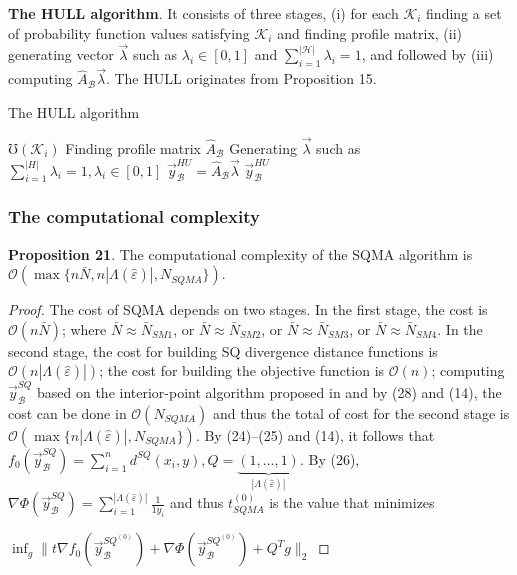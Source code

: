 \documentclass[]{iosart2c}
\begin{document}
  \textbf{The HULL algorithm}. It consists of three stages, (i) for each $\mathcal{K}_i$ finding a set of probability function
  values satisfying $\mathcal{K}_i$ and finding profile matrix, (ii)
  generating vector $\vec{\lambda}$ such as $\lambda_i \in [0, 1]$ and
  $\sum^{|\mathcal{H}|}_{i=1} \lambda_i = 1$, and followed by (iii) computing $\hat{A}_\mathcal{B}\vec{\lambda}$. The HULL originates from Proposition 15.

  \begin{algorithm}
    \caption{The HULL algorithm}
    \begin{algorithmic}[1]
        \State $\mho(\mathcal{K}_i)$
      \EndFor
      \State Finding profile matrix $\hat{A}_\mathcal{B}$
      \State Generating $\vec{\lambda}$ such as $\sum^{\mathcal|H|}_{i=1} \lambda_i = 1, \lambda_i \in [0, 1]$
      \State $\vec{y}^{HU}_\mathcal{B} = \hat{A}_\mathcal{B} \vec{\lambda}$
      \State \Return $\vec{y}^{HU}_\mathcal{B}$
    \end{algorithmic}
  \end{algorithm}

  \subsubsection{The computational complexity}

  \textbf{Proposition 21}. The computational complexity of the
  SQMA algorithm is $\mathcal{O}(\max\{n \bar{N}, n|\Lambda(\hat{\varepsilon})|,N_{SQMA} \})$.


  \begin{proof}
    The cost of SQMA depends on two stages. In
    the first stage, the cost is $\mathcal{O}(n\bar N)$; where $\bar N \approx \bar N_{SM1}$, or $\bar N \approx \bar N_{SM2}$, or $\bar N \approx \bar N_{SM3}$, or $\bar N \approx \bar N_{SM4}$. In the
    second stage, the cost for building SQ divergence distance
    functions is $\mathcal{O}(n |\Lambda(\hat{\varepsilon})|)$; the cost for building
    the objective function is $\mathcal{O}(n)$; computing $\vec{y}^{SQ}_\mathcal{B}$ based
    on the interior-point algorithm proposed in \cite{29} and
    by (28) and (14), the cost can be done in $\mathcal{O}(N_{SQMA})$
    and thus the total of cost for the second stage is
    $\mathcal{O}(\max\{n |\Lambda(\hat{\varepsilon})|,N_{SQMA}\})$. By (24)–(25) and (14),
    it follows that $f_0 \left( \vec{y}^{SQ}_\mathcal{B} \right) = \sum^n_{i=1} d^{SQ}(x_i, y), Q = \underbrace{(1, ... , 1)}_{|\Lambda(\hat{\varepsilon})|}$. By (26), $\nabla \Phi \left( \vec{y}^{SQ}_\mathcal{B} \right) = \sum^{|\Lambda(\hat{\varepsilon})|}_{i=1} \frac{1}{1
    y_i}$
    and
    thus $t^{(0)}_{SQMA}$ is the value that minimizes

    $\inf_g\parallel t\nabla f_0 \left( \vec{y}^{SQ^{(0)}}_\mathcal{B} \right) +\nabla \Phi \left( \vec{y}^{SQ^{(0)}}_\mathcal{B} \right) + Q^T g \parallel_2$
  \end{proof}
\end{document}
